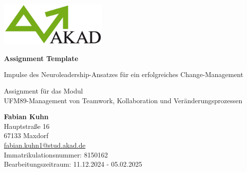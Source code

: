 \begin{titlepage}
    \begin{center}
        \includegraphics[width=0.4\textwidth]{images/university.png}
        
        \vspace*{4cm}
        
        \Huge
        \textbf{Assignment Template}

        \vspace{0.2cm}
        \large
        Impulse des Neuroleadership-Ansatzes für ein erfolgreiches Change-Management

        \vfill

        Assignment für das Modul\\
        UFM89-Management von Teamwork, Kollaboration und Veränderungsprozessen

        \vspace{0.8cm}
        \normalsize
        \textbf{Fabian Kuhn}\\
        Hauptstraße 16\\
        67133 Maxdorf\\
        \href{mailto:fabian.kuhn1@stud.akad.de}{fabian.kuhn1@stud.akad.de}\\
        Immatrikulationsnummer: 8150162\\
        Bearbeitungszeitraum: 11.12.2024 - 05.02.2025 \\
    \end{center}
\end{titlepage}